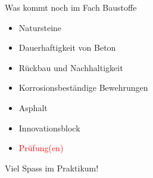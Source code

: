 \begin{frame}{Was kommt noch im Fach Baustoffe}
	\begin{itemize}
		\item[\textbullet] Natursteine
		\item[\textbullet] Dauerhaftigkeit von Beton
		\item[\textbullet] Rückbau und Nachhaltigkeit
		\item[\textbullet] Korrosionsbeständige Bewehrungen
		\item[\textbullet] Asphalt 
		\item[\textbullet] Innovationsblock 
		\item[\textbullet] \textcolor{red}{Prüfung(en)}    
	\end{itemize}

\end{frame}





\begin{frame}{Viel Spass im Praktikum!}

\end{frame}



